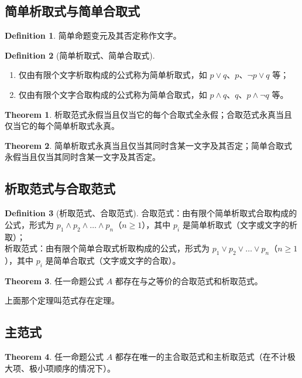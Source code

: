 \documentclass[oneside]{book}
\theoremstyle{definition}
\newtheorem{definition}{Definition}[section]
\newtheorem{theorem}{Theorem}[section]
\begin{document}
\subsection{简单析取式与简单合取式}
\begin{definition}
	简单命题变元及其否定称作文字。
\end{definition}
\begin{definition}[简单析取式、简单合取式]
	\begin{enumerate}
		\item 仅由有限个文字析取构成的公式称为简单析取式，如 \( p \lor q \)、\( p \)、\( \neg p \lor q \) 等；
		\item 仅由有限个文字合取构成的公式称为简单合取式，如 \( p \land q \)、\( q \)、\( p \land \neg q \) 等。
	\end{enumerate}

\end{definition}
\begin{theorem}
	析取范式永假当且仅当它的每个合取式全永假；合取范式永真当且仅当它的每个简单析取式永真。
\end{theorem}
\begin{theorem}
	简单析取式永真当且仅当其同时含某一文字及其否定；简单合取式永假当且仅当其同时含某一文字及其否定。
\end{theorem}

\subsection{析取范式与合取范式}
\begin{definition}[析取范式、合取范式]
	合取范式：由有限个简单析取式合取构成的公式，形式为 \( p_1 \land p_2 \land \dots \land p_n \)（\( n \geq 1 \)），其中 \( p_i \) 是简单析取式（文字或文字的析取）；\\
	析取范式：由有限个简单合取式析取构成的公式，形式为 \( p_1 \lor p_2 \lor \dots \lor p_n \)（\( n \geq 1 \)），其中 \( p_i \) 是简单合取式（文字或文字的合取）。
\end{definition}

\begin{theorem}
	任一命题公式 \( A \) 都存在与之等价的合取范式和析取范式。
\end{theorem}
上面那个定理叫范式存在定理。
\subsection{主范式}

\begin{theorem}
	任一命题公式 \( A \) 都存在唯一的主合取范式和主析取范式（在不计极大项、极小项顺序的情况下）。
\end{theorem}
\end{document}
